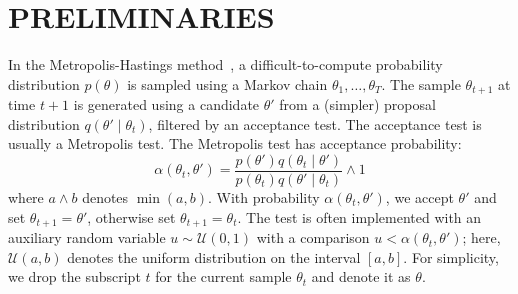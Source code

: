 \documentclass[twoside]{article} \usepackage{aistats2017}
\begin{document}
\section{PRELIMINARIES}\label{sec:related_work}

In the Metropolis-Hastings method~\citep{gilks1996markov,brooks2011handbook}, a
difficult-to-compute probability distribution $p(\theta)$ is sampled using a
Markov chain $\theta_1,\ldots,\theta_T$. The sample $\theta_{t+1}$ at time $t+1$
is generated using a candidate $\theta'$ from a (simpler) proposal distribution
$q(\theta'\mid \theta_t)$, filtered by an acceptance test. The acceptance test
is usually a Metropolis test. The Metropolis test has acceptance probability:
\begin{equation}\label{eq:traditional}
    \alpha(\theta_t,\theta') = \frac{p(\theta')q(\theta_t \mid \theta')}{p(\theta_t)q(\theta' \mid \theta_t)} \wedge 1
\end{equation}
where $a \wedge b$ denotes $\min(a,b)$.  With probability
$\alpha(\theta_t,\theta')$, we accept $\theta'$ and set $\theta_{t+1} =
\theta'$, otherwise set $\theta_{t+1}=\theta_t$.  The test is often implemented
with an auxiliary random variable $u \sim \mathcal{U}(0,1)$ with a comparison
$u<\alpha(\theta_t,\theta')$; here, $\mathcal{U}(a,b)$ denotes the uniform
distribution on the interval $[a,b]$.  For simplicity, we drop the subscript $t$
for the current sample $\theta_t$ and denote it as $\theta$. 
\end{document}
